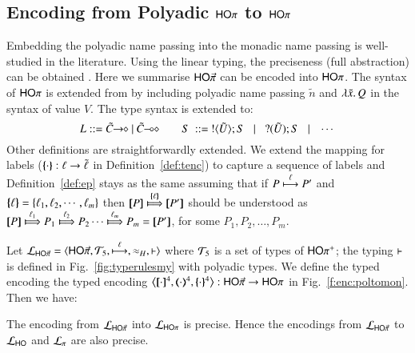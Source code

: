 \subsection{Encoding from Polyadic $\mathsf{HO}\pi$ to $\mathsf{HO}\pi$}
\label{subsec:pho}
\noi Embedding the polyadic name passing 
into the monadic name passing is well-studied in the literature.    
Using the linear typing, 
the preciseness (full abstraction) can be obtained \cite{Yoshida96}.
Here we summarise $\mathsf{HO}{\vec{\pi}}$ can be encoded into $\mathsf{HO}\pi$. 
The syntax of 
$\mathsf{HO}\pi$ is extended from \HOp by including 
polyadic name passing $\tilde{n}$ and $\lambda \tilde{x}.\,Q$ in the syntax 
of value $V$. The type syntax is extended to: 
\[
L ::= \shot{\tilde{C}} \ | \ \lhot{\tilde{C}}
\quad\quad S \ ::= \  \btout{\tilde{U}} S \bnfbar \btinp{\tilde{U}} S \bnfbar \cdots 
\]
Other definitions are straightforwardly extended. 
We extend the mapping for labels 
($\{\!\!\{\cdot\}\!\!\}: \ell \to \tilde{\ell}$ in  
Definition~\ref{def:tenc}) to capture 
a sequence of labels  and Definition~\ref{def:ep} stays as the same
assuming that if 
$P \stackrel{\ell}{\longmapsto} P'$ and $\{\!\!\{\ell\}\!\!\} = \{\ell_1, \ell_2,  \cdots, \ell_m\}$ then
$\map{P} \Hby{\mapa{\ell}} \map{P'}$
should be understood as
$\map{P} \Hby{\ell_1} P_1 \Hby{\ell_2} P_2 \cdots \Hby{\ell_m} P_m =  \map{P'}$,
for some
$P_1, P_2, \ldots, P_m$.

Let $\tyl{L}_{\PHOp}=\calc{\PHOp}{{\cal{T}}_5}{\hby{\ell}}{\wb_H}{\proves}$
where 
${\cal{T}}_5$ is a set of types of $\mathsf{HO\pi^{+}}$;  
the typing $\vdash$ is defined in 
Fig.~\ref{fig:typerulesmy} with polyadic types. 
We define the typed encoding 
the typed encoding $\enco{\map{\cdot}^{4}, \mapt{\cdot}^{4}, \mapa{\cdot}^{4}}: \PHOp \to \HOp$ 
in Fig.~\ref{f:enc:poltomon}. 
Then we have:

\smallskip 

\begin{theorem}
\label{f:enc:hopiptohopi}
The encoding from $\mathcal{L}_{\mathsf{HO}{\vec{\pi}}}$ into $\mathcal{L}_{\mathsf{HO}\pi}$ 
is precise. Hence the encodings 
from $\mathcal{L}_{\mathsf{HO}{\vec{\pi}}}$ to 
$\mathcal{L}_{\mathsf{HO}}$ 
and $\mathcal{L}_{\pi}$ 
are also precise. 
\end{theorem}

